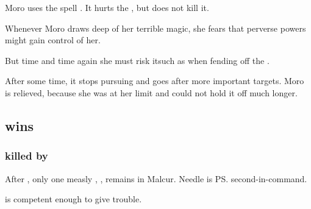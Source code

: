 \begin{garbage}
Moro uses the spell . 
It hurts the \bane, but does not kill it. 

Whenever Moro draws deep of her terrible magic, she fears that perverse powers might gain control of her. 


But time and time again she must risk it\dash such as when fending off the \bane. 


After some time, it stops pursuing and goes after more important targets. Moro is relieved, because she was at her limit and could not hold it off much longer. 









\subsection[Psyrex wins]{\Psyrex{} wins}





\subsubsection{\Paerzim{} killed by \Psyrex}
After , only one measly \resphan{}, \Paerzim, remains in Malcur. 
Needle is \ps{\Paerzim} second-in-command. 

\Paerzim{} is competent enough to give \Psyrex{} trouble. 


\end{garbage}
